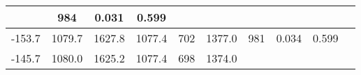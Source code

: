 \documentclass[a4paper,10pt]{article}
\begin{document}
\begin{longtable}{
     |
%    
    c|
%    
    c|
%    
    c|
%    
    c|
%    
    c|
%    
    c|
%    
    c|
%    
    c|
%    
    c|
%    
    c|
%    
    }
%        
        & 984
%        

%        

%        
        & 0.031
%        

%        

%        
        & 0.599
%        

%        
        \\
        \hline

        

%        

%        
        -153.7
%        

%        

%        
        & 1079.7
%        

%        

%        
        & 1627.8
%        

%        

%        
        & 1077.4
%        

%        

%        
        & 702
%        

%        

%        
        & 1377.0
%        

%        

%        
        & 981
%        

%        

%        
        & 0.034
%        

%        

%        
        & 0.599
%        

%        
        \\
        \hline

        

%        

%        
        -145.7
%        

%        

%        
        & 1080.0
%        

%        

%        
        & 1625.2
%        

%        

%        
        & 1077.4
%        

%        

%        
        & 698
%        

%        

%        
        & 1374.0
%        

%        


\end{longtable}
\end{document}
